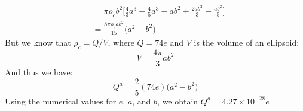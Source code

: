\begin{solution}
\begin{subequations}
\begin{align}
                                &=\pi\rho_{c}b^{2}
                                    \Big[\frac{4}{3}a^{3}-
                                         \frac{4}{5}a^{3}-
                                         ab^{2}+
                                         \frac{2ab^{2}}{3}-
                                         \frac{ab^{2}}{5}\Big]\\
                                &=\frac{8\pi\rho_{c}ab^{2}}{15}
                                    \big(a^{2}-b^{2}\big)
                        \end{align}
                    \end{subequations}
                    But we know that $\rho_{c}=Q/V$, where $Q=74e$ and
                    $V$ is the volume of an ellipsoid:
                    \begin{equation}
                        V=\frac{4\pi}{3}ab^{2}
                    \end{equation}
                    And thus we have:
                    \begin{equation}
                        Q^{a}=\frac{2}{5}(74e)\big(a^{2}-b^{2}\big)
                    \end{equation}
                    Using the numerical values for $e$, $a$, and $b$, we
                    obtain $Q^{a}=4.27\times{10}^{-28}e$
                \end{solution}
